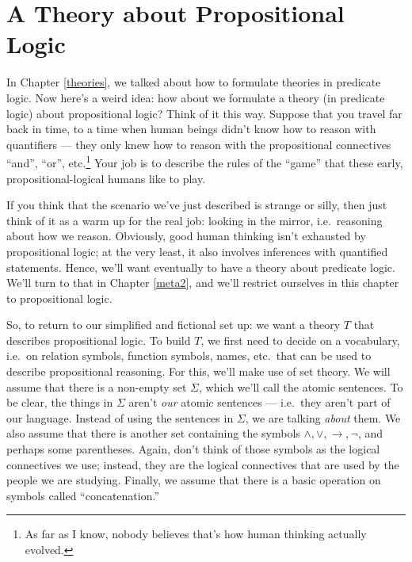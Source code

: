 \chapter{A Theory about Propositional Logic} \label{meta}

In Chapter \ref{theories}, we talked about how to formulate theories
in predicate logic.  Now here's a weird idea: how about we formulate a
theory (in predicate logic) about propositional logic?  Think of it
this way.  Suppose that you travel far back in time, to a time when
human beings didn't know how to reason with quantifiers --- they only
knew how to reason with the propositional connectives ``and'', ``or'',
etc.\footnote{As far as I know, nobody believes that's how human
  thinking actually evolved.}  Your job is to describe the rules of
the ``game'' that these early, propositional-logical humans like to
play.

If you think that the scenario we've just described is strange or
silly, then just think of it as a warm up for the real job: looking in
the mirror, i.e.\ reasoning about how we reason.  Obviously, good
human thinking isn't exhausted by propositional logic; at the very
least, it also involves inferences with quantified statements.  Hence,
we'll want eventually to have a theory about predicate logic.  We'll
turn to that in Chapter \ref{meta2}, and we'll restrict ourselves in
this chapter to propositional logic.

So, to return to our simplified and fictional set up: we want a theory
$T$ that describes propositional logic.  To build $T$, we first need
to decide on a vocabulary, i.e.\ on relation symbols, function
symbols, names, etc.\ that can be used to describe propositional
reasoning.  For this, we'll make use of set theory.  We will assume
that there is a non-empty set $\Sigma$, which we'll call the
\glspl{atomic sentence}.  To be clear, the things in $\Sigma$ aren't
{\it our} atomic sentences --- i.e.\ they aren't part of our language.
Instead of using the sentences in $\Sigma$, we are talking {\it about}
them.  We also assume that there is another set containing the symbols
$\wedge,\vee ,\to,\neg$, and perhaps some parentheses.  Again, don't
think of those symbols as the logical connectives we use; instead,
they are the logical connectives that are used by the people we are
studying.  Finally, we assume that there is a basic operation on
symbols called ``concatenation.'' \label{formation}

